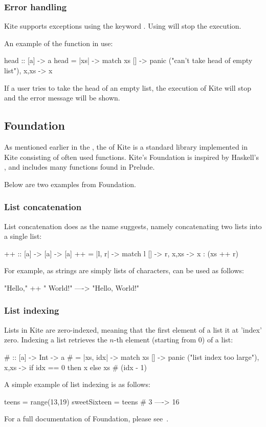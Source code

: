\subsubsection{Error handling}
Kite supports exceptions using the keyword . Using  will stop the execution.

An example of the  function in use:
\begin{kite}
  head :: [a] -> a
  head = |xs| -> {
    match xs {
      [] -> panic ("can't take head of empty list"),
      x,xs -> x
    }
  }
\end{kite}
If a user tries to take the head of an empty list, the execution of Kite will stop and the error message will be shown.


\subsection{Foundation}
As mentioned earlier in the , the  of Kite is a standard library implemented in Kite consisting of often used functions. Kite's Foundation is inspired by Haskell's , and includes many functions found in
Prelude.

Below are two examples from Foundation.

\subsubsection{List concatenation}
List concatenation does as the name suggests, namely concatenating two lists into a single list:

\begin{kite}
{++} :: [a] -> [a] -> [a]
{++} = |l, r| -> {
  match l {
    [] -> r,
    x,xs -> x : (xs ++ r)
  }
}
\end{kite}

For example, as strings are simply lists of characters, \code{++} can be used as follows:

\begin{kite}
"Hello," ++ " World!" ----> "Hello, World!"
\end{kite}

\subsubsection{List indexing}
Lists in Kite are zero-indexed, meaning that the first element of a list it at 'index' zero. Indexing a list retrieves the $n$-th element (starting from 0) of a list:

\begin{kite}
{#} :: [a] -> Int -> a
{#} = |xs, idx| -> {
  match xs {
    [] -> panic ("list index too large"),
    x,xs -> if idx == 0 then x else xs # (idx - 1)
  }
}
\end{kite}

A simple example of list indexing is as follows:

\begin{kite}
teens = range(13,19)
sweetSixteen = teens # 3 ----> 16
\end{kite}

For a full documentation of Foundation, please see~.